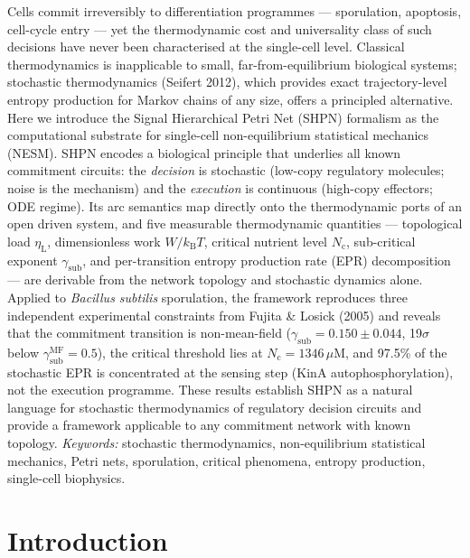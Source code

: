 \documentclass[11pt,a4paper]{article}
\newcommand{\kB}{k_{\mathrm{B}}}
\newcommand{\etaL}{\eta_{\mathrm{L}}}
\newcommand{\gsub}{\gamma_{\mathrm{sub}}}
\newcommand{\Nc}{N_{\mathrm{c}}}
\begin{document}
Cells commit irreversibly to differentiation programmes — sporulation,
apoptosis, cell-cycle entry — yet the thermodynamic cost and universality
class of such decisions have never been characterised at the single-cell
level.
Classical thermodynamics is inapplicable to small, far-from-equilibrium
biological systems; stochastic thermodynamics (Seifert 2012), which
provides exact trajectory-level entropy production for Markov chains of
any size, offers a principled alternative.
Here we introduce the Signal Hierarchical Petri Net (SHPN) formalism as the
computational substrate for single-cell non-equilibrium statistical
mechanics (NESM).
SHPN encodes a biological principle that underlies all known commitment
circuits: the \emph{decision} is stochastic (low-copy regulatory
molecules; noise is the mechanism) and the \emph{execution} is
continuous (high-copy effectors; ODE regime).
Its arc semantics map directly onto the thermodynamic
ports of an open driven system, and five measurable thermodynamic
quantities --- topological load $\etaL$, dimensionless work $W/\kB T$,
critical nutrient level $\Nc$, sub-critical exponent $\gsub$, and
per-transition entropy production rate (EPR) decomposition --- are
derivable from the network topology and stochastic dynamics alone.
Applied to \textit{Bacillus subtilis} sporulation, the framework
reproduces three independent experimental constraints from Fujita \&
Losick (2005) and reveals that the commitment transition is
non-mean-field ($\gsub = 0.150 \pm 0.044$, 19$\sigma$ below $\gsub^{\mathrm{MF}}
= 0.5$), the critical threshold lies at $\Nc = 1346\,\mu$M, and 97.5\%
of the stochastic EPR is concentrated at the sensing step (KinA
autophosphorylation), not the execution programme.
These results establish SHPN as a natural language for stochastic
thermodynamics of regulatory decision circuits and provide a framework
applicable to any commitment network with known topology.
\vspace{0.5em}
\noindent\textit{Keywords:} stochastic thermodynamics, non-equilibrium
statistical mechanics, Petri nets, sporulation, critical phenomena,
entropy production, single-cell biophysics.

\section{Introduction}
\label{sec:intro}
\end{document}
